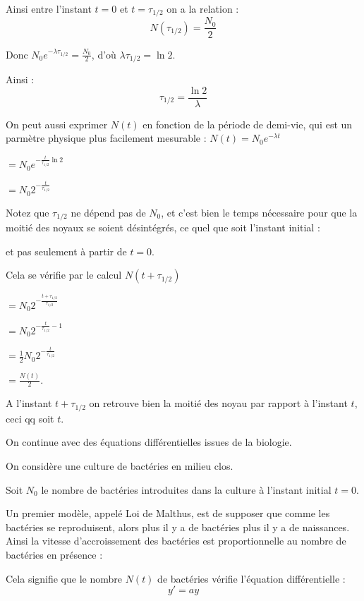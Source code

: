 \change
Ainsi entre l'instant $t=0$ et $t=\tau_{1/2}$ on a la relation :
  $$N(\tau_{1/2}) = \frac{N_0}{2}$$
  
\change  
  Donc $N_0 e^{ -\lambda \tau_{1/2} } =   \frac{N_0}{2}$, d'où 
  $\lambda \tau_{1/2} = \ln 2$.
  
\change
  Ainsi :
  $$\tau_{1/ 2} = \frac{\ln 2}{\lambda}$$

  \change         
  On peut aussi exprimer $N(t)$ en fonction de la période de demi-vie, qui est un parmètre
  physique plus facilement mesurable :
  $N(t) = N_0 e^{-\lambda t}$
  
  \change
  $=  N_0 e^{-\frac{t}{\tau_{1/2}} \ln 2}$
  
  \change
  $= N_0 2^{-\frac{t}{\tau_{1/2}}}$
  
  
  \change
    Notez que $\tau_{1/ 2}$ ne dépend pas de $N_0$, et c'est bien le
    temps nécessaire pour que la moitié des noyaux se
  soient désintégrés, ce quel que soit l'instant initial :
  
  et pas seulement à partir de $t=0$.
  
  \change  
  Cela se vérifie par le calcul
  $N(t+\tau_{1/ 2})$
  
  \change
  $= N_0 2^{-\frac{t+\tau_{1/2}}{\tau_{1/2}}}$
  
  \change
  $= N_0 2^{-\frac{t}{\tau_{1/2}}-1}$
  
  \change
  $  = \frac12 N_0 2^{-\frac{t}{\tau_{1/2}}}$
  
  \change
  $= \frac{N(t)}{2}.$
  
  A l'instant $t+\tau_{1/2}$ on retrouve bien la moitié des noyau par rapport
  à l'instant $t$, ceci qq soit $t$.
  

\diapo

On continue avec des équations différentielles issues de la biologie.

\change
On considère une culture de bactéries en milieu clos.


\change
Soit $N_0$ le nombre de bactéries introduites 
dans la culture à l'instant initial $t = 0$.


\change
\change


Un premier modèle, appelé Loi de Malthus, 
est de supposer que comme les bactéries se reproduisent, 
alors plus il y a de bactéries plus il y a de naissances.
Ainsi la vitesse d'accroissement des bactéries 
est proportionnelle au nombre de bactéries en présence :


\change
Cela signifie que le nombre $N(t)$ de bactéries vérifie l'équation différentielle :
$$y' = ay$$


